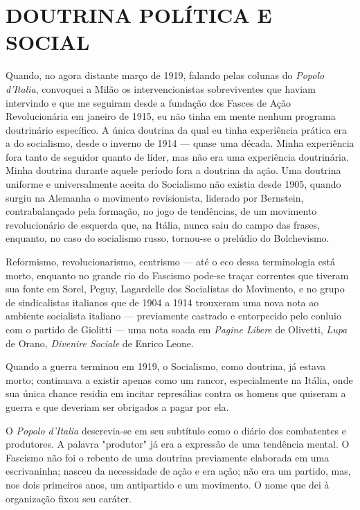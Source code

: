 \documentclass[12pt]{article}
\begin{document}
\section*{DOUTRINA POLÍTICA E SOCIAL}

Quando, no agora distante março de 1919, falando pelas colunas do \textit{Popolo d’Italia}, convoquei a Milão os intervencionistas sobreviventes que haviam intervindo e que me seguiram desde a fundação dos Fasces de Ação Revolucionária em janeiro de 1915, eu não tinha em mente nenhum programa doutrinário específico. A única doutrina da qual eu tinha experiência prática era a do socialismo, desde o inverno de 1914 — quase uma década. Minha experiência fora tanto de seguidor quanto de líder, mas não era uma experiência doutrinária. Minha doutrina durante aquele período fora a doutrina da ação. Uma doutrina uniforme e universalmente aceita do Socialismo não existia desde 1905, quando surgiu na Alemanha o movimento revisionista, liderado por Bernstein, contrabalançado pela formação, no jogo de tendências, de um movimento revolucionário de esquerda que, na Itália, nunca saiu do campo das frases, enquanto, no caso do socialismo russo, tornou-se o prelúdio do Bolchevismo.

Reformismo, revolucionarismo, centrismo — até o eco dessa terminologia está morto, enquanto no grande rio do Fascismo pode-se traçar correntes que tiveram sua fonte em Sorel, Peguy, Lagardelle dos Socialistas do Movimento, e no grupo de sindicalistas italianos que de 1904 a 1914 trouxeram uma nova nota ao ambiente socialista italiano — previamente castrado e entorpecido pelo conluio com o partido de Giolitti — uma nota soada em \textit{Pagine Libere} de Olivetti, \textit{Lupa} de Orano, \textit{Divenire Sociale} de Enrico Leone.

Quando a guerra terminou em 1919, o Socialismo, como doutrina, já estava morto; continuava a existir apenas como um rancor, especialmente na Itália, onde sua única chance residia em incitar represálias contra os homens que quiseram a guerra e que deveriam ser obrigados a pagar por ela.

O \textit{Popolo d’Italia} descrevia-se em seu subtítulo como o diário dos combatentes e produtores. A palavra "produtor" já era a expressão de uma tendência mental. O Fascismo não foi o rebento de uma doutrina previamente elaborada em uma escrivaninha; nasceu da necessidade de ação e era ação; não era um partido, mas, nos dois primeiros anos, um antipartido e um movimento. O nome que dei à organização fixou seu caráter.
\end{document}
